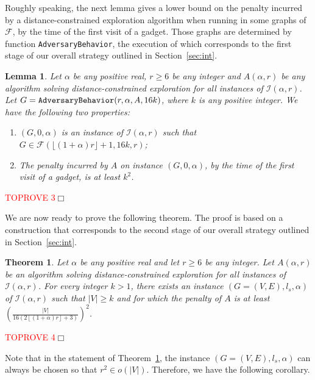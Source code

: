 \documentclass[11pt]{article}
\newtheorem{theorem}{Theorem}[section]
\newtheorem{lemma}{Lemma}[section]
\newcommand{\qed}{\hfill $\Box$ \bigbreak}
\newenvironment{proof}{\noindent {\bf Proof.}}{\qed}
\begin{document}
{Roughly speaking, the next lemma gives a lower bound on the penalty incurred by a distance-constrained exploration algorithm when running in some graphs of $\mathcal{F}$, by the time of the first visit of a gadget. Those graphs are determined by function {\tt AdversaryBehavior}, the execution of which corresponds to the first stage of our overall strategy outlined in Section~\ref{sec:int}.

\begin{lemma}
\label{lem:penagadget}
Let $\alpha$ be any positive real, $r\geq 6$ be any integer and $A(\alpha,r)$ be any algorithm solving distance-constrained exploration for all instances of $\mathcal{I}(\alpha,r)$. Let $G={\tt AdversaryBehavior}(r,\alpha,A,16k)$, where $k$ is any positive integer. We have the following two properties:  
\begin{enumerate}
\item $(G,0,\alpha)$ is an instance of $\mathcal{I}(\alpha,r)$ such that $G\in\mathcal{F}(\lfloor(1+\alpha)r\rfloor+1,16k,r)$;
\item The penalty incurred by $A$ on instance $(G,0,\alpha)$, by the time of the first visit of a gadget, is at least $k^2$.
\end{enumerate}
\end{lemma}

\begin{proof}\textcolor{red}{TOPROVE 3}\end{proof}

We are now ready to prove the following theorem. The proof is based on a construction that corresponds to the second stage of our overall strategy outlined in Section~\ref{sec:int}.

\begin{theorem}
\label{theo:theo1}
Let $\alpha$ be any positive real and let $r\geq 6$ be any integer. Let $A(\alpha,r)$ be an algorithm solving distance-constrained exploration for all instances of $\mathcal{I}(\alpha,r)$. For every integer $k>1$, there exists an instance $(G=(V,E),l_s,\alpha)$ of $\mathcal{I}(\alpha,r)$ such that $|V|\geq k$ and for which the penalty of $A$ is at least $\left(\frac{|V|}{16\left(2\left\lfloor(1+\alpha)r\right\rfloor+3\right)}\right)^2$.
\end{theorem}

\begin{proof}\textcolor{red}{TOPROVE 4}\end{proof}

Note that in the statement of Theorem~\ref{theo:theo1}, the instance $(G=(V, E), l_s, \alpha)$ can always be chosen so that $r^2\in o(|V|)$. Therefore, we have the following corollary.

}
\end{document}
